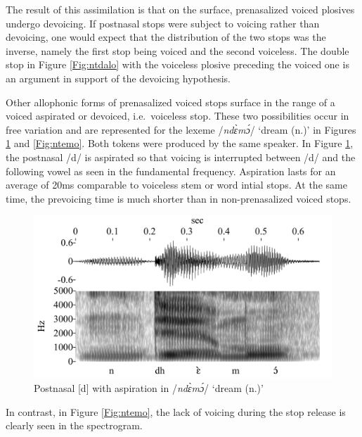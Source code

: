 The result of this assimilation is that on the surface, prenasalized voiced plosives undergo devoicing. If postnasal stops were subject to voicing rather than devoicing, one would expect that the distribution of the two stops was the inverse, namely the first stop being voiced and the second voiceless. The double stop in Figure \ref{Fig:ntdalo} with the voiceless plosive preceding the voiced one is an argument in support of the devoicing hypothesis.

Other allophonic forms of prenasalized voiced stops surface in the range of a voiced aspirated or devoiced, i.e.\ voiceless stop. These two possibilities occur in free variation and are represented for the lexeme /{\itshape ndɛ̀mɔ́}/ `dream (n.)' in Figures \ref{Fig:ndhemo} and \ref{Fig:ntemo}. Both tokens were produced by the same speaker. In Figure \ref{Fig:ndhemo}, the postnasal /d/ is aspirated so that voicing is interrupted between /d/ and the following vowel as seen in the fundamental frequency. 
Aspiration lasts for an average of 20ms comparable to voiceless stem or word intial stops. 
At the same time, the prevoicing time is much shorter than in non-prenasalized voiced stops.

\begin{figure} 
\centering
\includegraphics[width=\textwidth]{figures/ndhemo-mini}
\caption{Postnasal [d] with aspiration in /{\itshape ndɛ̀mɔ́}/ `dream (n.)'}
\label{Fig:ndhemo}
\end{figure}

\noindent In contrast, in Figure \ref{Fig:ntemo}, the lack of voicing during the stop release is clearly seen in the spectrogram.

